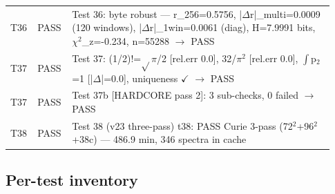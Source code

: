 \documentclass[10pt]{article}
\begin{document}
\begin{longtable}{p{0.06\linewidth} p{0.09\linewidth} p{0.78\linewidth}}
T36 & PASS & Test 36: byte robust --- r\_256=0.5756, |$\Delta$r|\_multi=0.0009 (120 windows), |$\Delta$r|\_1win=0.0061 (diag), H=7.9991 bits, $\chi$$^2$\_z=-0.234, n=55288 $\rightarrow$ PASS \\

T37 & PASS & Test 37: (1/2)!=$\sqrt{}$$\pi$/2 [rel.err 0.0], 32/$\pi$$^2$ [rel.err 0.0], $\int$p$_2$=1 [|$\Delta$|=0.0], uniqueness $\checkmark$ $\rightarrow$ PASS \\

T37 & PASS & Test 37b [HARDCORE pass 2]: 3 sub-checks, 0 failed $\rightarrow$ PASS \\

T38 & PASS & Test 38 (v23 three-pass) t38: PASS \textperiodcentered{} Curie 3-pass (72$^2$+96$^2$+38c) --- 486.9 min, 346 spectra in cache \\

\bottomrule
\end{longtable}

\subsection{Per-test inventory}
\end{document}
